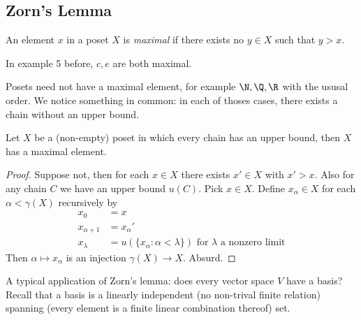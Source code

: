 \documentclass[a4paper]{article}
\begin{document}
\subsection{Zorn's Lemma}

\begin{definition}
  An element \(x\) in a poset \(X\) is \emph{maximal} if there exists no \(y \in X\) such that \(y > x\).
\end{definition}

\begin{eg}
  In example 5 before, \(c, e\) are both maximal.
\end{eg}

Posets need not have a maximal element, for example \(\N, \Q, \R\) with the ususal order. We notice something in common: in each of thoses cases, there exists a chain without an upper bound.

\begin{theorem}
  Let \(X\) be a (non-empty) poset in which every chain has an upper bound, then \(X\) has a maximal element.
\end{theorem}

\begin{proof}
  Suppose not, then for each \(x \in X\) there exists \(x' \in X\) with \(x' > x\). Also for any chain \(C\) we have an upper bound \(u(C)\). Pick \(x \in X\). Define \(x_\alpha \in X\) for each \(\alpha < \gamma(X)\) recursively by
  \begin{align*}
    x_0 &= x \\
    x_{\alpha + 1} &= x_\alpha' \\
    x_{\lambda} &= u(\{x_\alpha: \alpha < \lambda\}) \text{ for \(\lambda\) a nonzero limit}
  \end{align*}
  Then \(\alpha \mapsto x_\alpha\) is an injection \(\gamma(X) \to X\). Absurd.
\end{proof}

A typical application of Zorn's lemma: does every vector space \(V\) have a basis? Recall that a basis is a linearly independent (no non-trival finite relation) spanning (every element is a finite linear combination thereof) set.
\end{document}
